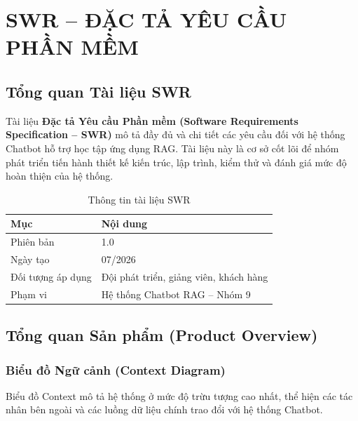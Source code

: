 ﻿%
\chapter{SWR -- ĐẶC TẢ YÊU CẦU PHẦN MỀM}

\section{Tổng quan Tài liệu SWR}

Tài liệu \textbf{Đặc tả Yêu cầu Phần mềm (Software Requirements Specification -- SWR)} mô tả đầy đủ và chi tiết các yêu cầu đối với hệ thống Chatbot hỗ trợ học tập ứng dụng RAG. Tài liệu này là cơ sở cốt lõi để nhóm phát triển tiến hành thiết kế kiến trúc, lập trình, kiểm thử và đánh giá mức độ hoàn thiện của hệ thống.

\begin{table}[H]
  \centering
  \caption{Thông tin tài liệu SWR}
  \label{tab:swr-info}
  \renewcommand{\arraystretch}{1.4}
  \begin{tabularx}{\textwidth}{|l|X|}
    \hline
    \rowcolor{blue!10}
    \textbf{Mục} & \textbf{Nội dung} \\
    \hline
    Phiên bản & 1.0 \\
    \hline
    Ngày tạo & 07/2026 \\
    \hline
    Đối tượng áp dụng & Đội phát triển, giảng viên, khách hàng \\
    \hline
    Phạm vi & Hệ thống Chatbot RAG -- Nhóm 9 \\
    \hline
  \end{tabularx}
\end{table}

\section{Tổng quan Sản phẩm (Product Overview)}

\subsection{Biểu đồ Ngữ cảnh (Context Diagram)}

Biểu đồ Context mô tả hệ thống ở mức độ trừu tượng cao nhất, thể hiện các tác nhân bên ngoài và các luồng dữ liệu chính trao đổi với hệ thống Chatbot.

